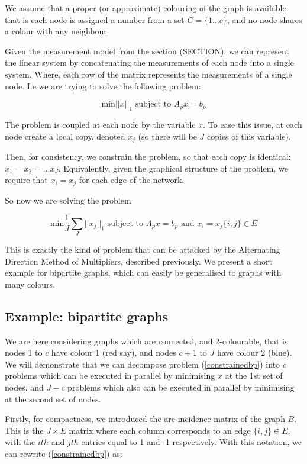 \documentclass{article}
\begin{document}
We assume that a proper (or approximate) colouring of the graph is available: that is each node is assigned a number from a set \(C = \{1 \ldots c \} \), and no node shares a colour with any neighbour.

Given the measurement model from the section (SECTION), we can represent the linear system by concatenating the measurements of each node into a single system. Where, each row of the matrix represents the measurements of a single node. I.e we are trying to solve the following problem:

\begin{equation}
\text{min} ||x||_1 \text{ subject to } A_p x = b_p
\end{equation}

The problem is coupled at each node by the variable \(x\). To ease this issue, at each node create a local copy, denoted \(x_j\) (so there will be \(J\) copies of this variable). 

Then, for consistency, we constrain the problem, so that each copy is identical: \(x_1 = x_2 = \ldots x_J\). Equivalently, given the graphical structure of the problem, we require that \(x_i = x_j\) for each edge of the network.

So now we are solving the problem

\begin{equation}
\text{min} \frac{1}{J}\sum_J||x_j||_1 \text{ subject to } A_p x = b_p \text{ and } x_i = x_j \{i,j\} \in E 
 \label{constrainedbp}
\end{equation}
 
This is exactly the kind of problem that can be attacked by the Alternating Direction Method of Multipliers, described previously. We present a short example for bipartite graphs, which can easily be generalised to graphs with many colours. 
 
\subsection{Example: bipartite graphs}
We are here considering graphs which are connected, and 2-colourable, that is nodes 1 to \(c\) have colour 1 (red say), and nodes \(c+1\) to \(J\) have colour 2 (blue). We will demonstrate that we can decompose problem (\ref{constrainedbp}) into \(c\) problems which can be executed in parallel by minimising \(x\) at the 1st set of nodes, and \(J - c\) problems which also can be executed in parallel by minimising at the second set of nodes. 

Firstly, for compactness, we introduced the arc-incidence matrix of the graph \(B\). This is the \(J \times E\) matrix where each column corresponds to an edge \(\{i,j\} \in E\), with the \(ith\) and \(jth\) entries equal to 1 and -1 respectively. With this notation, we can rewrite (\ref{constrainedbp}) as:
\end{document}
